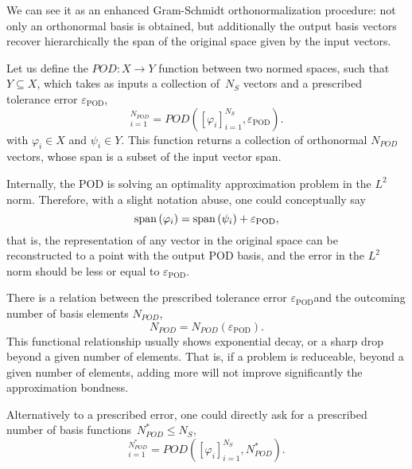\documentclass[../../1_heat_equation.tex]{subfiles}
\newcommand{\epspod}{\ensuremath{\varepsilon_\text{POD}}}
\begin{document}
We can see it as an enhanced Gram-Schmidt orthonormalization procedure: not only an orthonormal basis is obtained, but additionally the output basis vectors recover hierarchically the span of the original space given by the input vectors.

Let us define the $POD: X \rightarrow Y$ function between two normed spaces, 
such that $Y \subseteq  X$, 
which takes as inputs a collection of~$N_S$ vectors and a prescribed tolerance error $\epspod$,
\begin{equation}
    [\psi_i]_{i=1}^{N_{POD}} = POD\left([\varphi_i]_{i=1}^{N_S}, \epspod\right).
\end{equation}
with $\varphi_i \in X$ and $\psi_i \in Y$.
This function returns a collection of orthonormal $N_{POD}$ vectors, whose span is a subset of the input vector span.

Internally, the POD is solving an optimality approximation problem in the $L^2$ norm. 
Therefore, with a slight notation abuse, one could conceptually say
\begin{equation}
    \spn{\varphi_i} = \spn{\psi_i} + \epspod,
\end{equation}
that is, the representation of any vector in the original space can be reconstructed to a point with the output POD basis, 
and the error in the $L^2$ norm should be less or equal to \epspod.

There is a relation between the prescribed tolerance error \epspod and the outcoming number of basis elements $N_{POD}$, 
\begin{equation}
    N_{POD} = N_{POD}(\epspod).
\end{equation}
This functional relationship usually shows exponential decay, or a sharp drop beyond a given number of elements.
That is, if a problem is reduceable, beyond a given number of elements, adding more will not improve significantly the approximation bondness. 

Alternatively to a prescribed error, one could directly ask for a prescribed number of basis functions~$N^{*}_{POD} \leq N_S$,
\begin{equation}
    [\psi_i]_{i=1}^{N^{*}_{POD}} = POD\left([\varphi_i]_{i=1}^{N_S}, N^{*}_{POD}\right).
\end{equation}
\end{document}
